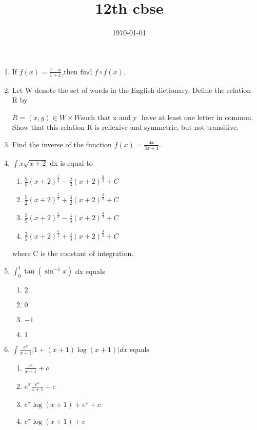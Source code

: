\documentclass[12pt]{article}
\title{12th cbse}
\date{\today}
\begin{document}
\begin{enumerate}
\item If $f(x)=\frac{1-x}{1+x}$,then find $f\circ f(x)$.
\item Let W denote the set of words in the English dictionary. Define the relation R by

$R = (x, y) \in W \times W \text{such that} \text{ x  and y }  \text{ have at least one letter in common}$.
Show that this relation R is reflexive and symmetric, but not transitive.

\item Find the inverse of the function $f(x) = \frac{4x}{3x+4}$.

\item $\int x \sqrt{x + 2}$ dx is equal to
\begin{enumerate}
\item $\frac{2}{5}(x + 2)^{\frac{5}{2}} - \frac{2}{3}(x + 2)^{\frac{3}{2}} + C$
\item $\frac{5}{2}(x + 2)^{\frac{5}{2}} + \frac{3}{2}(x + 2)^{\frac{3}{2}} + C$
\item $\frac{2}{5}(x + 2)^{\frac{5}{2}} - \frac{4}{3}(x + 2)^{\frac{3}{2}} + C$
\item $\frac{2}{5}(x + 2)^{\frac{5}{2}} + \frac{4}{3}(x + 2)^{\frac{3}{2}} + C$
\end{enumerate}

where C is the constant of integration.

\item  $\int_{0}^{1} \tan(\sin^{-1}x)$ dx equals
\begin{enumerate}

\item $2$ 
\item  $0$
\item  $-1$
\item  $1$
\end{enumerate}

\item $\int {\frac{e^x}{x+1}}|1+(x+1)\log(x+1)| dx $ equals
\begin{enumerate}
\item  $\frac{e^x}{x+1}+c$
\item  $e^x\frac{e^x}{x+1}+c$
\item  $e^x\log(x+1)+e^x+c$
\item  $e^x\log(x+1)+c$
\end{enumerate}


\end{enumerate}
\end{document}

